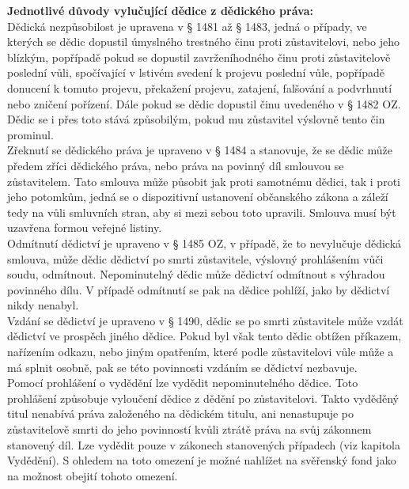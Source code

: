 \documentclass{article}
\begin{document}
\noindent\textbf{Jednotlivé důvody vylučující dědice z dědického práva:} \\

Dědická nezpůsobilost je upravena v § 1481 až § 1483, jedná o případy, ve kterých se dědic dopustil úmyslného trestného činu proti zůstavitelovi, nebo jeho blízkým, popřípadě pokud se dopustil zavrženíhodného činu proti zůstavitelově poslední vůli, spočívající v lstivém svedení k projevu poslední vůle, popřípadě donucení k tomuto projevu, překažení projevu, zatajení, falšování a podvrhnutí nebo zničení pořízení. Dále pokud se dědic dopustil činu uvedeného v § 1482 OZ. Dědic se i přes toto stává způsobilým, pokud mu zůstavitel výslovně tento čin prominul. \\

Zřeknutí se dědického práva je upraveno v § 1484 a stanovuje, že se dědic může předem zříci dědického práva, nebo práva na povinný díl smlouvou se zůstavitelem. Tato smlouva může působit jak proti samotnému dědici, tak i proti jeho potomkům, jedná se o dispozitivní ustanovení občanského zákona a záleží tedy na vůli smluvních stran, aby si mezi sebou toto upravili. Smlouva musí být uzavřena formou veřejné listiny. \\

Odmítnutí dědictví je upraveno v § 1485 OZ, v případě, že to nevylučuje dědická smlouva, může dědic dědictví po smrti zůstavitele, výslovný prohlášením vůči soudu, odmítnout. Nepominutelný dědic může dědictví odmítnout s výhradou povinného dílu. V případě odmítnutí se pak na dědice pohlíží, jako by dědictví nikdy nenabyl.\\

Vzdání se dědictví je upraveno v § 1490, dědic se po smrti zůstavitele může vzdát dědictví ve prospěch jiného dědice. Pokud byl však tento dědic obtížen příkazem, nařízením odkazu, nebo jiným opatřením, které podle zůstavitelovi vůle může a má splnit osobně, pak se této povinnosti vzdáním se dědictví nezbavuje.\\

Pomocí prohlášení o vydědění lze vydědit nepominutelného dědice. Toto prohlášení způsobuje vyloučení dědice z dědění po zůstavitelovi. Takto vyděděný titul nenabívá práva založeného na dědickém titulu, ani nenastupuje po zůstavitelově smrti do jeho povinností kvůli ztrátě práva na svůj zákonnem stanovený díl. Lze vydědit pouze v zákonech stanovených případech (viz kapitola Vydědění). S ohledem na toto omezení je možné nahlížet na svěřenský fond jako na možnost obejití tohoto omezení.\\
\end{document}
